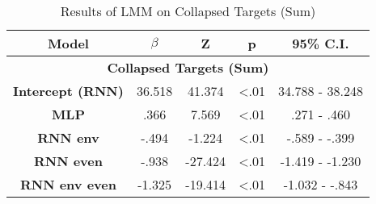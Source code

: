 \begin{table}[h]
\centering
\caption{Results of LMM on Collapsed Targets (Sum)}
\label{collapsed_lmm_33}
\begin{tabular}{ccccc}
\hline
\textbf{Model}           & \textbf{$\beta$} & \textbf{Z} & \textbf{p} & \textbf{95\% C.I.} \\ \hline
\multicolumn{5}{c}{\textbf{Collapsed Targets (Sum)}}                                                 \\ \hline
\textbf{Intercept (RNN)} & 36.518                & 41.374     & \textless .01   & 34.788 - 38.248      \\
\textbf{MLP}           & .366                 & 7.569     & \textless .01   & .271 - .460        \\
\textbf{RNN env}          & -.494                 & -1.224     & \textless .01   & -.589 - -.399        \\
\textbf{RNN even}            & -.938                 & -27.424     & \textless .01   & -1.419 - -1.230        \\
\textbf{RNN env even}             & -1.325                 & -19.414     & \textless .01   & -1.032 - -.843        \\ \hline
\end{tabular}
\end{table}
